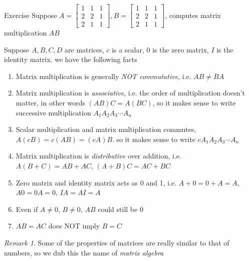 \documentclass{beamer}
\theoremstyle{definition}
\theoremstyle{remark}
\newtheorem*{remark}{Remark}
\begin{document}
\begin{frame}[t]{Exercise}
Suppose $A=\begin{bmatrix}
1&1&1\\
2&2&1\\
2&1&1
\end{bmatrix}, B=\begin{bmatrix}
1&1&1\\
2&2&1\\
2&1&1
\end{bmatrix}$, computes matrix multiplication $AB$
\end{frame}

\begin{frame}[t]
Suppose $A,B,C,D$ are matrices, $c$ is a scalar, $0$ is the zero matrix, $I$ is the identity matrix. we have the following facts\pause
\begin{enumerate}
\item Matrix multiplication is generally \textit{NOT commutative}, i.e. $AB\neq BA$\pause
\item Matrix multiplication is \textit{associative}, i.e. the order of multiplication doesn't matter, in other words $(AB)C=A(BC)$, so it makes sense to write successive multiplication $A_1A_2A_3\cdots A_n$\pause
\item Scalar multiplication and matrix multiplication commutes, $A(cB)=c(AB)=(cA)B$. so it makes sense to write $cA_1A_2A_3\cdots A_n$\pause
\item Matrix multiplication is \textit{distributive} over addition, i.e. $A(B+C)=AB+AC$, $(A+B)C=AC+BC$\pause
\item Zero matrix and identity matrix acts as 0 and 1, i.e. $A+0=0+A=A$, $A0=0A=0$, $IA=AI=A$\pause
\item Even if $A\neq0$, $B\neq0$, $AB$ could still be $0$\pause
\item $AB=AC$ does NOT imply $B=C$
\end{enumerate}
\pause
\begin{remark}
Some of the properties of matrices are really similar to that of numbers, so we dub this the name of \textit{matrix algebra}
\end{remark}
\end{frame}
\end{document}
